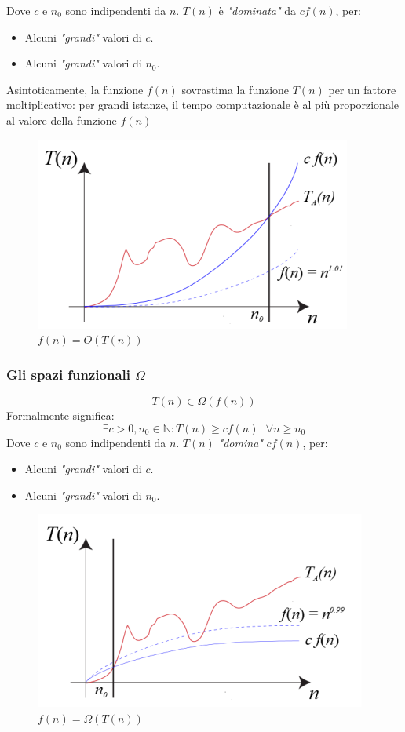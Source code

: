 \documentclass{article}
\begin{document}
Dove $c$ e $n_0$ sono indipendenti da $n$. $T(n)$ è \textit{"dominata"} da $c f(n)$, per:
\begin{itemize}
    \item Alcuni \textit{"grandi"} valori di $c$.
    \item Alcuni \textit{"grandi"} valori di $n_0$.
\end{itemize}
Asintoticamente, la funzione $f(n)$ sovrastima la funzione $T(n)$ per un fattore moltiplicativo: per
grandi istanze, il tempo computazionale è al più proporzionale al valore della funzione $f(n)$
\begin{figure}[H]
    \centering
    \includegraphics[scale=0.8]{images/ogrande.png}
    \caption{$f(n)=O(T(n))$}
\end{figure}

\subsubsection{\texorpdfstring{Gli spazi funzionali $\Omega$}{}}
$$T (n) \in \Omega (f (n))$$
Formalmente significa:
$$\exists c>0, n_0\in\mathbb{N}:T(n)\geq c f(n) \text{  }\forall n\geq n_0$$
Dove $c$ e $n_0$ sono indipendenti da $n$. $T(n)$ \textit{"domina"} $c f(n)$, per:
\begin{itemize}
    \item Alcuni \textit{"grandi"} valori di $c$.
    \item Alcuni \textit{"grandi"} valori di $n_0$.
\end{itemize}

\begin{figure}[H]
    \centering
    \includegraphics[scale=1]{images/omega.png}
    \caption{$f(n)=\Omega(T(n))$}
\end{figure}
\end{document}
